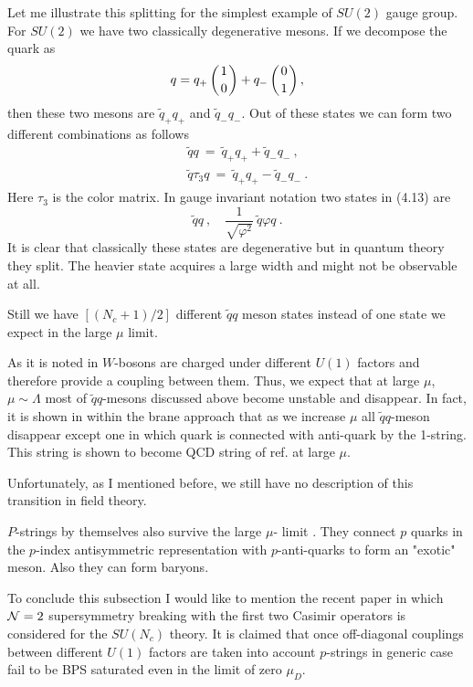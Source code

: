 \documentclass[a4paper,12pt]{article}
\begin{document}
Let me illustrate this splitting for the simplest example of
$SU(2)$ gauge group. For $SU(2)$ we have two classically degenerative
mesons. If we decompose the
quark as
\begin{equation}
q=q_+\left({1 \atop 0}\right)+q_-\left({0 \atop 1}\right),
\end{equation}
then these two mesons are $\tilde q_+q_+$ and $\tilde q_-q_-$.
Out of these states  we
can form two different combinations as follows
\begin{eqnarray}
&& \tilde qq\ =\ \tilde q_+q_+ +\tilde q_-q_-\ , \nonumber\\
&& \tilde q\tau_3q\ =\ \tilde q_+q_+ -\tilde q_-q_-\ .
\end{eqnarray}
Here $\tau_3$ is the color matrix. In gauge invariant notation
two states in (4.13) are
\begin{equation}
\tilde qq\ , \quad \frac1{\sqrt{\varphi^2}}\ \tilde
q\varphi q\ .
\end{equation}
It is clear that
classically these states are degenerative but in quantum theory
they split. The heavier state acquires a large width and might
not be observable at all.

Still we have $[(N_c+1)/2]$ different $\tilde qq$ meson states
instead of one state we expect in the large $\mu $ limit.

As it is noted in \cite{DS} $W$-bosons are charged under
different $U(1)$ factors and therefore provide a coupling between
them. Thus, we expect that at large $\mu $, $\mu \sim
\Lambda$ most of $\tilde qq$-mesons discussed above
 become unstable and disappear.
In fact, it is shown in \cite{HSZ} within the brane approach
that as we increase $\mu $ all $\tilde qq$-meson disappear
except one in which quark is connected with anti-quark by the
1-string. This string is shown \cite{HSZ} to become QCD string
of ref.\cite{W} at large $\mu $.

Unfortunately, as I mentioned before, we still have no
description of this transition in  field theory.

$P$-strings by themselves also survive the large $\mu $-
limit \cite{HSZ}. They connect $p$ quarks in the $p$-index
antisymmetric representation with $p$-anti-quarks to form an
"exotic" meson. Also they can form  baryons.

To conclude this subsection I would like to mention the recent
paper \cite{Sp2} in which ${\cal N}=2$ supersymmetry breaking
with the first two Casimir operators is considered
for the $SU(N_{c})$ theory. It is claimed that
once off-diagonal couplings between different $U(1)$ factors
are taken into account $p$-strings in generic case 
fail to be BPS saturated
even in the limit of zero $\mu_{D}$.
\end{document}
